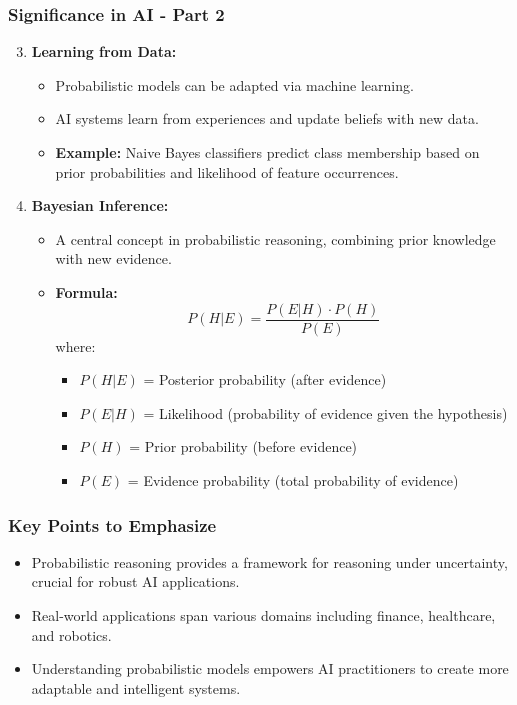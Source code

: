 \documentclass[aspectratio=169]{beamer}
\begin{document}
\begin{frame}[fragile]
    \frametitle{Significance in AI - Part 2}
    \begin{enumerate}
        \setcounter{enumi}{2}
        \item \textbf{Learning from Data:}
        \begin{itemize}
            \item Probabilistic models can be adapted via machine learning.
            \item AI systems learn from experiences and update beliefs with new data.
            \item \textbf{Example:} Naive Bayes classifiers predict class membership based on prior probabilities and likelihood of feature occurrences.
        \end{itemize}

        \item \textbf{Bayesian Inference:}
        \begin{itemize}
            \item A central concept in probabilistic reasoning, combining prior knowledge with new evidence.
            \item \textbf{Formula:} 
            \begin{equation}
                P(H|E) = \frac{P(E|H) \cdot P(H)}{P(E)}
            \end{equation}
            where:
            \begin{itemize}
                \item $P(H|E)$ = Posterior probability (after evidence)
                \item $P(E|H)$ = Likelihood (probability of evidence given the hypothesis)
                \item $P(H)$ = Prior probability (before evidence)
                \item $P(E)$ = Evidence probability (total probability of evidence)
            \end{itemize}
        \end{itemize}
    \end{enumerate}
\end{frame}

\begin{frame}[fragile]
    \frametitle{Key Points to Emphasize}
    \begin{itemize}
        \item Probabilistic reasoning provides a framework for reasoning under uncertainty, crucial for robust AI applications.
        \item Real-world applications span various domains including finance, healthcare, and robotics.
        \item Understanding probabilistic models empowers AI practitioners to create more adaptable and intelligent systems.
    \end{itemize}
\end{frame}
\end{document}

